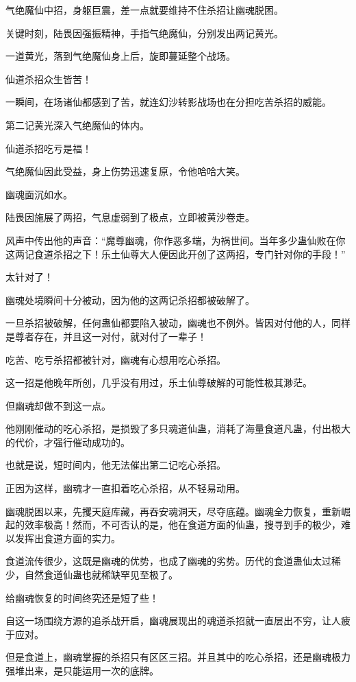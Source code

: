 \begin{this_body}
气绝魔仙中招，身躯巨震，差一点就要维持不住杀招让幽魂脱困。

关键时刻，陆畏因强振精神，手指气绝魔仙，分别发出两记黄光。

一道黄光，落到气绝魔仙身上后，旋即蔓延整个战场。

仙道杀招众生皆苦！

一瞬间，在场诸仙都感到了苦，就连幻沙转影战场也在分担吃苦杀招的威能。

第二记黄光深入气绝魔仙的体内。

仙道杀招吃亏是福！

气绝魔仙因此受益，身上伤势迅速复原，令他哈哈大笑。

幽魂面沉如水。

陆畏因施展了两招，气息虚弱到了极点，立即被黄沙卷走。

风声中传出他的声音：“魔尊幽魂，你作恶多端，为祸世间。当年多少蛊仙败在你这两记食道杀招之下！乐土仙尊大人便因此开创了这两招，专门针对你的手段！”

太针对了！

幽魂处境瞬间十分被动，因为他的这两记杀招都被破解了。

一旦杀招被破解，任何蛊仙都要陷入被动，幽魂也不例外。皆因对付他的人，同样是尊者存在，并且这一对付，就对付了一辈子！

吃苦、吃亏杀招都被针对，幽魂有心想用吃心杀招。

这一招是他晚年所创，几乎没有用过，乐土仙尊破解的可能性极其渺茫。

但幽魂却做不到这一点。

他刚刚催动的吃心杀招，是损毁了多只魂道仙蛊，消耗了海量食道凡蛊，付出极大的代价，才强行催动成功的。

也就是说，短时间内，他无法催出第二记吃心杀招。

正因为这样，幽魂才一直扣着吃心杀招，从不轻易动用。

幽魂脱困以来，先攫天庭库藏，再吞安魂洞天，尽夺底蕴。幽魂全力恢复，重新崛起的效率极高！然而，不可否认的是，他在食道方面的仙蛊，搜寻到手的极少，难以发挥出食道方面的实力。

食道流传很少，这既是幽魂的优势，也成了幽魂的劣势。历代的食道蛊仙太过稀少，自然食道仙蛊也就稀缺罕见至极了。

给幽魂恢复的时间终究还是短了些！

自这一场围绕方源的追杀战开启，幽魂展现出的魂道杀招就一直层出不穷，让人疲于应对。

但是食道上，幽魂掌握的杀招只有区区三招。并且其中的吃心杀招，还是幽魂极力强堆出来，是只能运用一次的底牌。


\end{this_body}
